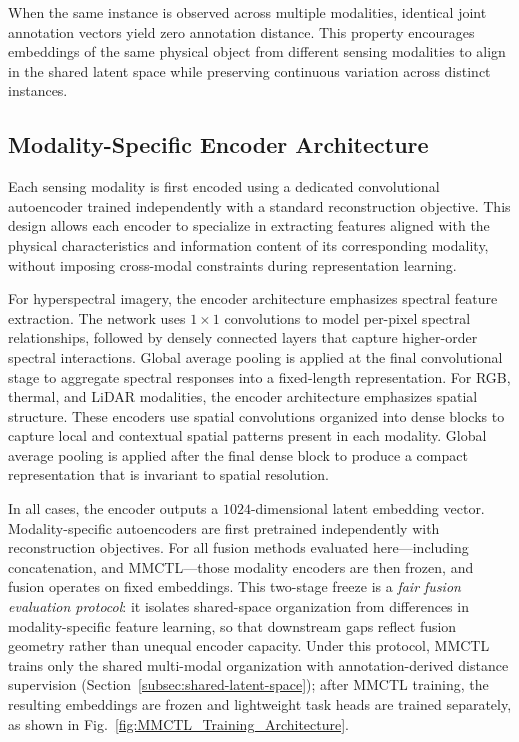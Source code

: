 \documentclass[10pt,twocolumn,letterpaper]{article}
\begin{document}
When the same instance is observed across multiple modalities, identical joint
annotation vectors yield zero annotation distance. This property encourages
embeddings of the same physical object from different sensing modalities to
align in the shared latent space while preserving continuous variation across
distinct instances.


\subsection{Modality-Specific Encoder Architecture}

Each sensing modality is first encoded using a dedicated convolutional autoencoder trained independently with a standard reconstruction objective. This design allows each encoder to specialize in extracting features aligned with the physical characteristics and information content of its corresponding modality, without imposing cross-modal constraints during representation learning.

For hyperspectral imagery, the encoder architecture emphasizes spectral feature extraction. The network uses $1 \times 1$ convolutions to model per-pixel spectral relationships, followed by densely connected layers that capture higher-order spectral interactions. Global average pooling is applied at the final convolutional stage to aggregate spectral responses into a fixed-length representation. For RGB, thermal, and LiDAR modalities, the encoder architecture emphasizes spatial structure. These encoders use spatial convolutions organized into dense blocks to capture local and contextual spatial patterns present in each modality. Global average pooling is applied after the final dense block to produce a compact representation that is invariant to spatial resolution.

In all cases, the encoder outputs a $1024$-dimensional latent embedding vector. Modality-specific autoencoders are first pretrained independently with reconstruction objectives. For all fusion methods evaluated here---including concatenation,  and MMCTL---those modality encoders are then frozen, and fusion operates on fixed embeddings. This two-stage freeze is a \emph{fair fusion evaluation protocol}: it isolates shared-space organization from differences in modality-specific feature learning, so that downstream gaps reflect fusion geometry rather than unequal encoder capacity. Under this protocol, MMCTL trains only the shared multi-modal organization with annotation-derived distance supervision (Section~\ref{subsec:shared-latent-space}); after MMCTL training, the resulting embeddings are frozen and lightweight task heads are trained separately, as shown in Fig.~\ref{fig:MMCTL_Training_Architecture}. 
\end{document}
